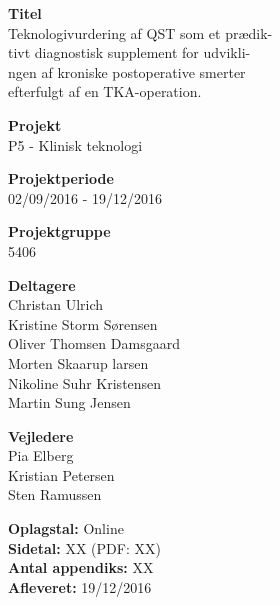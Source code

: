 \begin{minipage}[t]{0.48\textwidth}
\textbf{Titel} \\[5pt]\hspace*{2ex} 
Teknologivurdering af QST som et prædik-\\\hspace*{2ex}
tivt diagnostisk supplement for udvikli-\\\hspace*{2ex} 
ngen af kroniske postoperative smerter \\\hspace*{2ex} 
efterfulgt af en TKA-operation. \\\hspace*{2ex} 



\textbf{Projekt} \\[5pt]\hspace*{2ex} 
P5 - Klinisk teknologi\\\hspace*{2ex}


\textbf{Projektperiode} \\[5pt]\bigskip\hspace{2ex}
02/09/2016 - 19/12/2016

\textbf{Projektgruppe} \\[5pt]\bigskip\hspace{2ex}
5406

\textbf{Deltagere} \\[5pt]\hspace*{2ex}
Christan Ulrich \\\hspace*{2ex}
Kristine Storm Sørensen \\\hspace*{2ex}
Oliver Thomsen Damsgaard \\\hspace*{2ex}
Morten Skaarup larsen\\\hspace*{2ex}
Nikoline Suhr Kristensen \\\hspace*{2ex}
Martin Sung Jensen \\\bigskip\hspace{2ex}


\textbf{Vejledere} \\[5pt]\hspace*{2ex}
Pia  Elberg \\\hspace*{2ex}
Kristian Petersen\\\hspace*{2ex}
Sten Ramussen\\\smallskip\hspace*{2ex}

\textbf{Oplagstal:} Online \\
\textbf{Sidetal:} XX (PDF: XX) \\
\textbf{Antal appendiks:} XX \\ 
\textbf{Afleveret:} 19/12/2016

\end{minipage}
